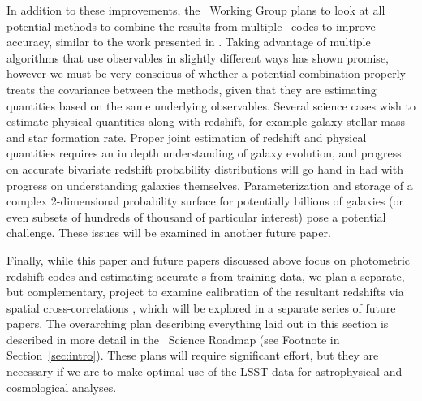 In addition to these improvements, the \lsstdesc \Pz\ Working Group plans to look at all potential methods to combine the results from multiple \pzpdf\ codes to improve accuracy, similar to the work presented in \citet{Dahlen:13,Carrascokind:14,Duncan:18}.
Taking advantage of multiple algorithms that use observables in slightly different ways has shown promise, however we must be very conscious of whether a potential combination properly treats the covariance between the methods, given that they are estimating quantities based on the same underlying observables.
Several science cases wish to estimate physical quantities along with redshift, for example galaxy stellar mass and star formation rate.
Proper joint estimation of redshift and physical quantities requires an in depth understanding of galaxy evolution, and progress on accurate bivariate redshift probability distributions will go hand in had with progress on understanding galaxies themselves.
Parameterization and storage of a complex 2-dimensional probability surface for potentially billions of galaxies (or even subsets of hundreds of thousand of particular interest) pose a potential challenge.
These issues will be examined in another future paper.

Finally, while this paper and future papers discussed above focus on photometric redshift codes and estimating accurate \pzpdf s from training data, we plan a separate, but complementary, project to examine calibration of the resultant redshifts via spatial cross-correlations \citep{Newman:2008}, which will be explored in a separate series of future papers.
The overarching plan describing everything laid out in this section is described in more detail in the \lsstdesc\ Science Roadmap (see Footnote in Section~\ref{sec:intro}).
These plans will require significant effort, but they are necessary if we are to make optimal use of the LSST data for astrophysical and cosmological analyses.
